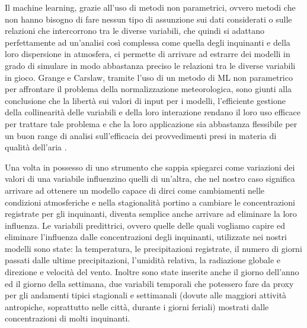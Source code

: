 Il machine learning, grazie all'uso di metodi non parametrici, ovvero metodi che non hanno bisogno di fare nessun tipo di assunzione sui dati considerati o sulle relazioni che intercorrono tra le diverse variabili, che quindi si adattano perfettamente ad un'analisi così complessa come quella degli inquinanti e della loro dispersione in atmosfera, ci permette di arrivare ad estrarre dei modelli in grado di simulare in modo abbastanza preciso le relazioni tra le diverse variabili in gioco.  
Grange e Carslaw, tramite l'uso di un metodo di ML non parametrico per affrontare il problema della normalizzazione meteorologica, sono giunti alla conclusione che la libertà sui valori di input per i modelli, l'efficiente gestione della collinearità delle variabili e della loro interazione rendano il loro uso efficace per trattare tale problema e che la loro applicazione sia abbastanza flessibile per un buon range di analisi sull'efficacia dei provvedimenti presi in materia di qualità dell'aria \cite{grange2019using}.

Una volta in possesso di uno strumento che sappia spiegarci come variazioni dei valori di una variabile influenzino quelli di un'altra, che nel nostro caso significa arrivare ad ottenere un modello capace di dirci come cambiamenti nelle condizioni atmosferiche e nella stagionalità portino a cambiare le concentrazioni registrate per gli inquinanti, diventa semplice anche arrivare ad eliminare la loro influenza. Le variabili predittrici, ovvero quelle delle quali vogliamo capire ed eliminare l'influenza dalle concentrazioni degli inquinanti, utilizzate nei nostri modelli sono state: la temperatura, le precipitazioni registrate, il numero di giorni passati dalle ultime precipitazioni, l'umidità relativa, la radiazione globale e direzione e velocità del vento. Inoltre sono state inserite anche il giorno dell'anno ed il giorno della settimana, due variabili temporali che potessero fare da proxy
 per gli andamenti tipici stagionali e settimanali (dovute alle maggiori attività antropiche, soprattutto nelle città, durante i giorni feriali) mostrati dalle concentrazioni di molti inquinanti. 

